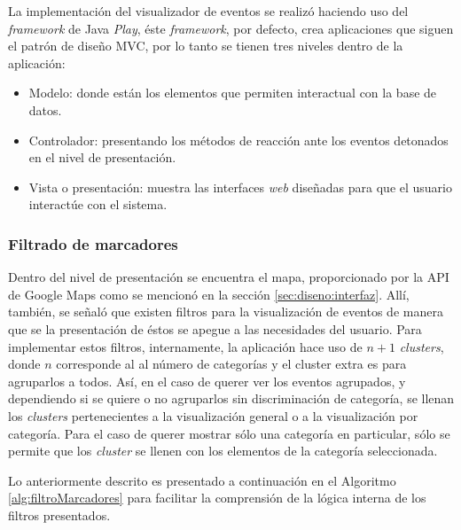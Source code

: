 La implementación del visualizador de eventos se realizó haciendo uso del \textit{framework} de Java \textit{Play}, éste \textit{framework}, por defecto, crea aplicaciones que siguen el patrón de diseño MVC, por lo tanto se tienen tres niveles dentro de la aplicación:

\begin{itemize}
\item Modelo: donde están los elementos que permiten interactual con la base de datos. 
\item Controlador: presentando los métodos de reacción ante los eventos detonados en el nivel de presentación.
\item Vista o presentación: muestra las interfaces \textit{web} diseñadas para que el usuario interactúe con el sistema.
\end{itemize}

\subsubsection*{Filtrado de marcadores}
\label{subsubsec:filtradoMarcadores}

Dentro del nivel de presentación se encuentra el mapa, proporcionado por la API de Google Maps como se mencionó en la sección \ref{sec:diseno:interfaz}. Allí, también, se señaló que existen filtros para la visualización de eventos de manera que se la presentación de éstos se apegue a las necesidades del usuario. Para implementar estos filtros, internamente, la aplicación hace uso de $n + 1$ \textit{clusters}, donde $n$ corresponde al al número de categorías y el cluster extra es para agruparlos a todos. Así, en el caso de querer ver los eventos agrupados, y dependiendo si se quiere o no agruparlos sin discriminación de categoría, se llenan los \textit{clusters} pertenecientes a la visualización general o a la visualización por categoría. Para el caso de querer mostrar sólo una categoría en particular, sólo se permite que los \textit{cluster} se llenen con los elementos de la categoría seleccionada.

Lo anteriormente descrito es presentado a continuación en el Algoritmo \ref{alg:filtroMarcadores} para facilitar la comprensión de la lógica interna de los filtros presentados.\\

